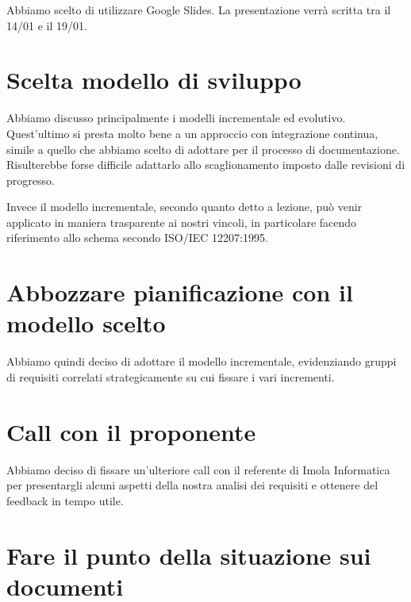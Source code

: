 \documentclass{article}
\begin{document}
Abbiamo scelto di utilizzare Google Slides. La presentazione verrà scritta tra il 14/01 e il 19/01.

\section{Scelta modello di sviluppo}%
\label{sec:scelta_modello_di_sviluppo}

Abbiamo discusso principalmente i modelli incrementale ed evolutivo.
Quest'ultimo si presta molto bene a un approccio con integrazione continua, simile a quello che abbiamo scelto di adottare per il processo di documentazione.
Risulterebbe forse difficile adattarlo allo scaglionamento imposto dalle revisioni di progresso.

Invece il modello incrementale, secondo quanto detto a lezione, può venir applicato in maniera trasparente ai nostri vincoli, in particolare facendo riferimento allo schema secondo ISO/IEC 12207:1995.

\section{Abbozzare pianificazione con il modello scelto}%
\label{sec:abbozzare_pianificazione_con_il_modello_scelto}

Abbiamo quindi deciso di adottare il modello incrementale, evidenziando gruppi di requisiti correlati strategicamente su cui fissare i vari incrementi.

\section{Call con il proponente}%
\label{sec:call_con_il_proponente}

Abbiamo deciso di fissare un'ulteriore call con il referente di Imola Informatica per presentargli alcuni aspetti della nostra analisi dei requisiti e ottenere del feedback in tempo utile.

\section{Fare il punto della situazione sui documenti}%
\label{sec:fare_il_punto_della_situazione_sui_documenti}
\end{document}
